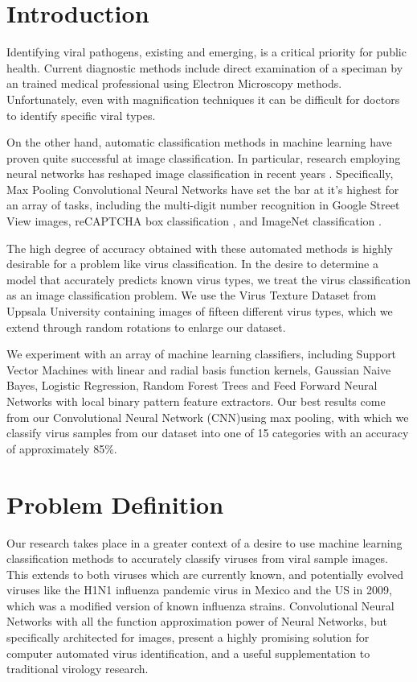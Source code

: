 \begin{multicols}{2}
\section{Introduction}
Identifying viral pathogens, existing and emerging, is a critical priority for public health. Current diagnostic methods include direct examination of a speciman by an trained medical professional using Electron Microscopy methods. Unfortunately, even with magnification techniques it can be difficult for doctors to identify specific viral types. 

On the other hand, automatic classification methods in machine learning have proven quite successful at image classification. In particular, research employing neural networks has reshaped image classification in recent years \citet{Juergen_2015}. Specifically, Max Pooling Convolutional Neural Networks have set the bar at it's highest for an array of tasks, including the multi-digit number recognition in Google Street View images, reCAPTCHA box classification \citet{DBLP:journals/corr/GoodfellowBIAS13}, and ImageNet classification \citet{NIPS2012_4824}. 

The high degree of accuracy obtained with these automated methods is highly desirable for a problem like virus classification. In the desire to determine a model that accurately predicts known virus types, we treat the virus classification as an image classification problem. We use the Virus Texture Dataset from Uppsala University containing images of fifteen different virus types, which we extend through random rotations to enlarge our dataset. 

We experiment with an array of machine learning classifiers, including Support Vector Machines with linear and radial basis function kernels, Gaussian Naive Bayes, Logistic Regression, Random Forest Trees and Feed Forward Neural Networks with local binary pattern feature extractors. Our best results come from our Convolutional Neural Network (CNN)using max pooling, with which we classify virus samples from our dataset into one of 15 categories with an accuracy of approximately 85\%.\

\section{Problem Definition}

Our research takes place in a greater context of a desire to use machine learning classification methods to accurately classify viruses from viral sample images. This extends to both viruses which are currently known, and potentially evolved viruses like the H1N1 influenza pandemic virus in Mexico and the US in 2009, which was a modified version of known influenza strains. Convolutional Neural Networks with all the function approximation power of Neural Networks, but specifically architected for images, present a highly promising solution for computer automated virus identification, and a useful supplementation to traditional virology research. 


\end{multicols}
